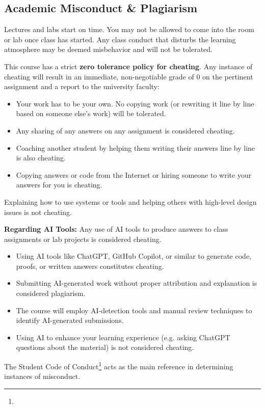 \documentclass[10pt,a4paper,american]{article}
\begin{document}
\subsection{Academic Misconduct \& Plagiarism}
Lectures and labs start on time. You may not be allowed to come into the room or lab once class has started. Any class conduct that disturbs the learning atmosphere may be deemed misbehavior and will not be tolerated.

This course has a strict \textbf{zero tolerance policy for cheating}. Any instance of cheating will result in an immediate, non-negotiable grade of 0 on the pertinent assignment and a report to the university faculty:
\begin{itemize}
	\item Your work has to be your own. No copying work (or rewriting it line by line based on someone else's work) will be tolerated.
	\item Any sharing of any answers on any assignment is considered cheating.
	\item Coaching another student by helping them writing their answers line by line is also cheating.
	\item Copying answers or code from the Internet or hiring someone to write your answers for you is cheating.
\end{itemize}

Explaining how to use systems or tools and helping others with high-level design issues is not cheating.

\textbf{Regarding AI Tools:} Any use of AI tools to produce answers to class assignments or lab projects is considered cheating.
\begin{itemize}
	\item Using AI tools like ChatGPT, GitHub Copilot, or similar to generate code, proofs, or written answers constitutes cheating.
	\item Submitting AI-generated work without proper attribution and explanation is considered plagiarism.
	\item The course will employ AI-detection tools and manual review techniques to identify AI-generated submissions.
	\item Using AI to enhance your learning experience (e.g. asking ChatGPT questions about the material) is not considered cheating.
\end{itemize}

The Student Code of Conduct\footnote{\urlcodeofconduct} acts as the main reference in determining instances of misconduct.
\end{document}
